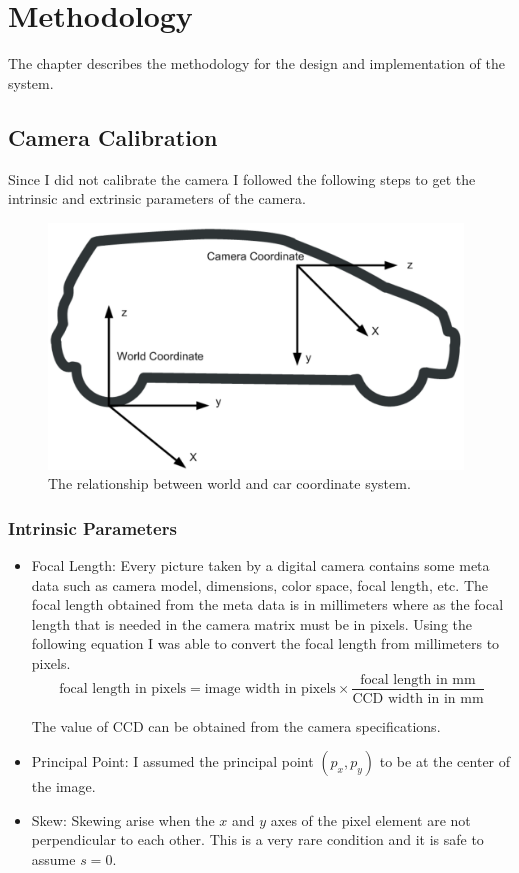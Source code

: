 \setlength{\footskip}{8mm}
\chapter{ Methodology } \label{methodology}
The chapter describes the methodology for the design and implementation of the system. 

\section{Camera Calibration}
Since I did not calibrate the camera I followed the 
following steps to get the intrinsic and extrinsic parameters of the camera.  

\begin{figure}
\centering
\includegraphics[width=110mm]{figures/camera-car-coordinate-system3.pdf}
\caption{The relationship between world and car coordinate system.}
\label{fig:camera_car_coordinate}
\end{figure}

\subsection{Intrinsic Parameters}
\begin{itemize}
  \item Focal Length: Every picture taken by a digital camera contains some meta 
data such as camera model, dimensions, color space, focal length, etc. The focal 
length obtained from the meta data is in millimeters where as the focal length 
that is needed in the camera matrix must be in pixels. Using the following 
equation I was able to convert the focal length from 
millimeters to pixels.  
\[ \text{focal length in pixels} =
     \text{image width in pixels} \times 
     \frac{\text{focal length in mm}} {\text{CCD width in in mm}} 
\]
  
The value of CCD can be obtained from the camera specifications. 
\item Principal Point: I assumed the principal point $(p_{x}, p_{y})$ to be at 
the center of the image. 
\item Skew: Skewing arise when the $x$ and $y$ axes of the pixel element are not 
perpendicular to each other. This is a very rare condition and it is safe to 
assume $s = 0$. 
\end{itemize}

